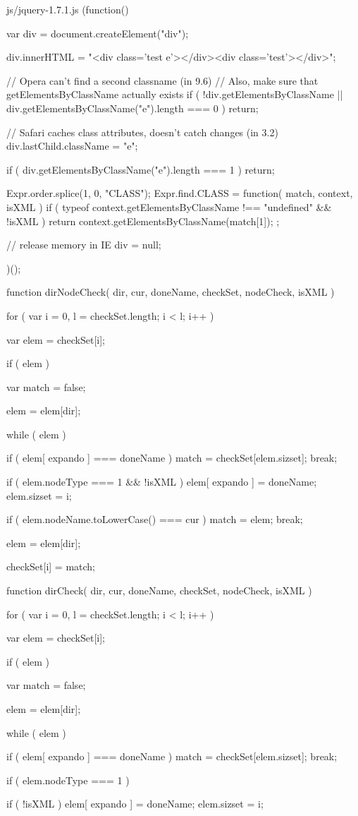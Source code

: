 \documentclass{article}
\begin{document}
\begin{chunk}{js/jquery-1.7.1.js}
(function(){
	var div = document.createElement("div");

	div.innerHTML = "<div class='test e'></div><div class='test'></div>";

	// Opera can't find a second classname (in 9.6)
	// Also, make sure that getElementsByClassName actually exists
	if ( !div.getElementsByClassName || div.getElementsByClassName("e").length === 0 ) {
		return;
	}

	// Safari caches class attributes, doesn't catch changes (in 3.2)
	div.lastChild.className = "e";

	if ( div.getElementsByClassName("e").length === 1 ) {
		return;
	}
	
	Expr.order.splice(1, 0, "CLASS");
	Expr.find.CLASS = function( match, context, isXML ) {
		if ( typeof context.getElementsByClassName !== "undefined" && !isXML ) {
			return context.getElementsByClassName(match[1]);
		}
	};

	// release memory in IE
	div = null;
})();

function dirNodeCheck( dir, cur, doneName, checkSet, nodeCheck, isXML ) {
	for ( var i = 0, l = checkSet.length; i < l; i++ ) {
		var elem = checkSet[i];

		if ( elem ) {
			var match = false;

			elem = elem[dir];

			while ( elem ) {
				if ( elem[ expando ] === doneName ) {
					match = checkSet[elem.sizset];
					break;
				}

				if ( elem.nodeType === 1 && !isXML ){
					elem[ expando ] = doneName;
					elem.sizset = i;
				}

				if ( elem.nodeName.toLowerCase() === cur ) {
					match = elem;
					break;
				}

				elem = elem[dir];
			}

			checkSet[i] = match;
		}
	}
}

function dirCheck( dir, cur, doneName, checkSet, nodeCheck, isXML ) {
	for ( var i = 0, l = checkSet.length; i < l; i++ ) {
		var elem = checkSet[i];

		if ( elem ) {
			var match = false;
			
			elem = elem[dir];

			while ( elem ) {
				if ( elem[ expando ] === doneName ) {
					match = checkSet[elem.sizset];
					break;
				}

				if ( elem.nodeType === 1 ) {
					if ( !isXML ) {
						elem[ expando ] = doneName;
						elem.sizset = i;
					}

}}}}}
\end{chunk}
\end{document}
